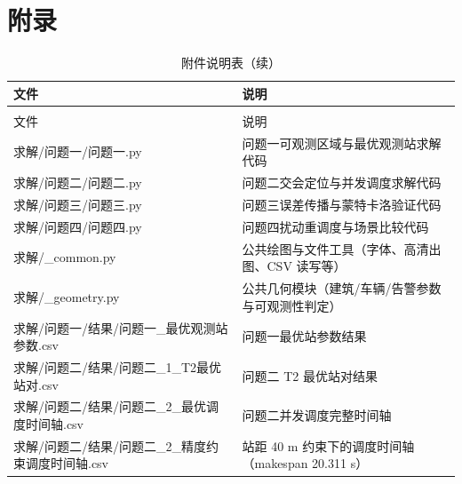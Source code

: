 
\newpage
\makeatletter
\let\@oldaddcontentsline\addcontentsline
\renewcommand{\addcontentsline}[3]{}

\section*{附录}
\let\addcontentsline\@oldaddcontentsline
\makeatother

\renewcommand{\arraystretch}{1.2}
\begin{longtable}{>{\centering\arraybackslash}p{}>{\raggedright\arraybackslash}p{}}
  \caption{附件说明表}
  \label{tab:appendix} \\
  \toprule
  文件 & 说明 \\
  \midrule
  \endfirsthead
  \caption{附件说明表（续）} \\
  \toprule
  文件 & 说明 \\
  \midrule
  \endhead
  \bottomrule
  \endfoot
  求解/\allowbreak{}问题一/\allowbreak{}问题一.py & 问题一可观测区域与最优观测站求解代码 \\
  求解/\allowbreak{}问题二/\allowbreak{}问题二.py & 问题二交会定位与并发调度求解代码 \\
  求解/\allowbreak{}问题三/\allowbreak{}问题三.py & 问题三误差传播与蒙特卡洛验证代码 \\
  求解/\allowbreak{}问题四/\allowbreak{}问题四.py & 问题四扰动重调度与场景比较代码 \\
  求解/\allowbreak{}\_common.py & 公共绘图与文件工具（字体、高清出图、CSV 读写等） \\
  求解/\allowbreak{}\_geometry.py & 公共几何模块（建筑/车辆/告警参数与可观测性判定） \\
  求解/\allowbreak{}问题一/\allowbreak{}结果/\allowbreak{}问题一\_\allowbreak{}最优观测站参数.csv & 问题一最优站参数结果 \\
  求解/\allowbreak{}问题二/\allowbreak{}结果/\allowbreak{}问题二\_\allowbreak{}1\_\allowbreak{}T2最优站对.csv & 问题二 T2 最优站对结果 \\
  求解/\allowbreak{}问题二/\allowbreak{}结果/\allowbreak{}问题二\_\allowbreak{}2\_\allowbreak{}最优调度时间轴.csv & 问题二并发调度完整时间轴 \\
  求解/\allowbreak{}问题二/\allowbreak{}结果/\allowbreak{}问题二\_\allowbreak{}2\_\allowbreak{}精度约束调度时间轴.csv & 站距 40 m 约束下的调度时间轴（makespan 20.311 s） \\

\end{longtable}
